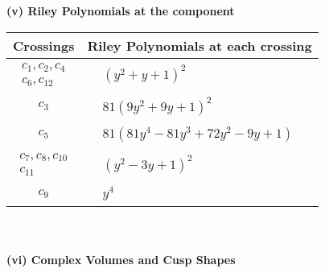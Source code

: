 \documentclass[1p]{elsarticle_modified}
\theoremstyle{definition}
\begin{document}
\newpage\renewcommand{\arraystretch}{1}
\flushleft \textbf{(v) Riley Polynomials at the component}\newline \\
\begin{tabular}{m{50pt}|m{274pt}}
Crossings & \hspace{64pt}Riley Polynomials at each crossing \\
\hline $$\begin{aligned}c_{1},c_{2},c_{4}\\c_{6},c_{12}\end{aligned}$$&$\begin{aligned}
&(y^2+y+1)^2
\end{aligned}$\\
\hline $$\begin{aligned}c_{3}\end{aligned}$$&$\begin{aligned}
&81(9 y^2+9 y+1)^2
\end{aligned}$\\
\hline $$\begin{aligned}c_{5}\end{aligned}$$&$\begin{aligned}
&81(81 y^4-81 y^3+72 y^2-9 y+1)
\end{aligned}$\\
\hline $$\begin{aligned}c_{7},c_{8},c_{10}\\c_{11}\end{aligned}$$&$\begin{aligned}
&(y^2-3 y+1)^2
\end{aligned}$\\
\hline $$\begin{aligned}c_{9}\end{aligned}$$&$\begin{aligned}
&y^4
\end{aligned}$\\
\hline
\end{tabular}\\~\\
\newpage\flushleft \textbf{(vi) Complex Volumes and Cusp Shapes}
\end{document}
